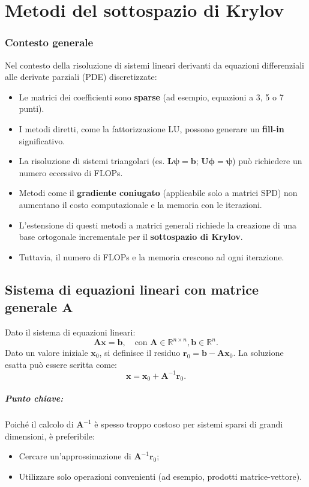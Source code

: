 \chapter{Metodi del sottospazio di Krylov}
\subsection{Contesto generale}
Nel contesto della risoluzione di sistemi lineari derivanti da equazioni differenziali alle derivate parziali (PDE) discretizzate:
\begin{itemize}
	\item Le matrici dei coefficienti sono \textbf{sparse} (ad esempio, equazioni a 3, 5 o 7 punti).
	\item I metodi diretti, come la fattorizzazione LU, possono generare un \textbf{fill-in} significativo.
	\item La risoluzione di sistemi triangolari (es. $\mathbf{L}\mathbf{\psi} = \mathbf{b}$; $\mathbf{U}\mathbf{\phi} = \mathbf{\psi}$) può richiedere un numero eccessivo di FLOPs.
	\item Metodi come il \textbf{gradiente coniugato} (applicabile solo a matrici SPD) non aumentano il costo computazionale e la memoria con le iterazioni.
	\item L'estensione di questi metodi a matrici generali richiede la creazione di una base ortogonale incrementale per il \textbf{sottospazio di Krylov}.
	\item Tuttavia, il numero di FLOPs e la memoria crescono ad ogni iterazione.
\end{itemize}

\section{Sistema di equazioni lineari con matrice generale $\mathbf{A}$}
Dato il sistema di equazioni lineari:
\[
\mathbf{A} \mathbf{x} = \mathbf{b}, \quad \text{con } \mathbf{A} \in \mathbb{R}^{n \times n}, \mathbf{b} \in \mathbb{R}^{n}. \tag{1}
\]
Dato un valore iniziale $\mathbf{x}_0$, si definisce il residuo $\mathbf{r}_0 = \mathbf{b} - \mathbf{A} \mathbf{x}_0$. La soluzione esatta può essere scritta come:
\[
\mathbf{x} = \mathbf{x}_0 + \mathbf{A}^{-1} \mathbf{r}_0. \tag{2}
\]
\paragraph{Punto chiave:}
Poiché il calcolo di $\mathbf{A}^{-1}$ è spesso troppo costoso per sistemi sparsi di grandi dimensioni, è preferibile:
\begin{itemize}
	\item Cercare un'approssimazione di $\mathbf{A}^{-1} \mathbf{r}_0$;
	\item Utilizzare solo operazioni convenienti (ad esempio, prodotti matrice-vettore).
\end{itemize}

